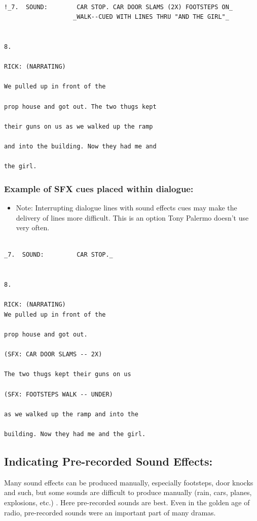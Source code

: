 \documentclass[openleft,oneside,showtrims]{memoir}
\begin{document}
\lstset{language=fountain,label= ,caption= ,captionpos=b,numbers=none}
\begin{lstlisting}

!_7.  SOUND:        CAR STOP. CAR DOOR SLAMS (2X) FOOTSTEPS ON_
                   _WALK--CUED WITH LINES THRU "AND THE GIRL"_


8.

RICK: (NARRATING)
  
We pulled up in front of the
  
prop house and got out. The two thugs kept
  
their guns on us as we walked up the ramp
  
and into the building. Now they had me and
  
the girl.

\end{lstlisting}

\subsubsection*{Example of SFX cues placed within dialogue:}
\label{sec:org2145695}

\begin{itemize}
\item Note: Interrupting dialogue lines with sound effects cues may make the delivery of lines more difficult. This is an option Tony Palermo doesn't use very often.
\end{itemize}

\lstset{language=fountain,label= ,caption= ,captionpos=b,numbers=none}
\begin{lstlisting}

_7.  SOUND:         CAR STOP._


8.

RICK: (NARRATING)
We pulled up in front of the
  
prop house and got out.
  
(SFX: CAR DOOR SLAMS -- 2X)
  
The two thugs kept their guns on us
  
(SFX: FOOTSTEPS WALK -- UNDER)
  
as we walked up the ramp and into the
  
building. Now they had me and the girl.

\end{lstlisting}
\subsection{Indicating Pre-recorded Sound Effects:}
\label{sec:orgb55f1ec}
Many sound effects can be produced manually, especially footsteps, door knocks and such, but some sounds are difficult to produce manually (rain, cars, planes, explosions, etc.) . Here pre-recorded sounds are best. Even in the golden age of radio, pre-recorded sounds were an important part of many dramas.
\end{document}

